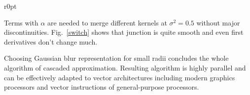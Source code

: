 \documentclass[10pt]{article}
\begin{document}
\begin{wrapfigure}{r}{0pt}
    \caption{Resulting filter coefficients for $0 \le \sigma^2 \le 1$.}
    \label{switch}
\end{wrapfigure}

Terms with $\alpha$ are needed to merge different kernels at $\sigma^2 = 0.5$ without major
discontinuities. Fig.~\ref{switch} shows that junction is quite smooth and even first derivatives
don't change much.

Choosing Gaussian blur representation for small radii concludes the whole algorithm of cascaded
approximation. Resulting algorithm is highly parallel and can be effectively adapted to vector
architectures including modern graphics processors and vector instructions of general-purpose
processors.
\end{document}
